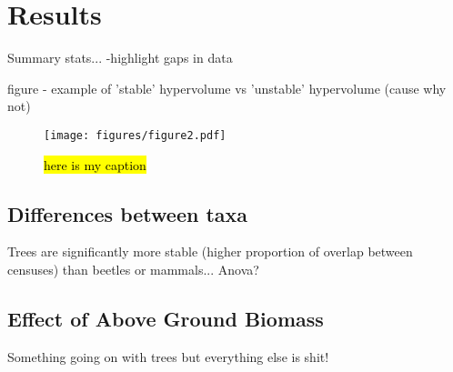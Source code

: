 
\section{Results}


Summary stats... -highlight gaps in data

figure - example of 'stable' hypervolume vs 'unstable' hypervolume (cause why not)


\begin{figure}
	\centering
	\texttt{[image: figures/figure2.pdf]}
	\caption{\hl{here is my caption}}
	\label{fig:2}
\end{figure}

\subsection{Differences between taxa}

Trees are significantly more stable (higher proportion of overlap between censuses) than beetles or mammals...
Anova?

\subsection{Effect of Above Ground Biomass}
Something going on with trees but everything else is shit!
